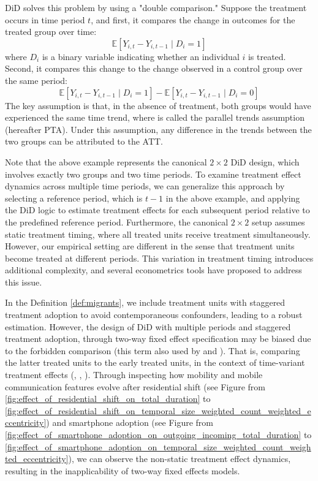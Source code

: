 DiD solves this problem by using a "double comparison." Suppose the treatment occurs in time period \( t \), and first, it compares the change in outcomes for the treated group over time:
\[
\mathbb{E}[Y_{i, t} - Y_{i, t-1} \mid D_i = 1]
\]
where \( D_i \) is a binary variable indicating whether an individual \( i \) is treated. Second, it compares this change to the change observed in a control group over the same period:
\[
\mathbb{E}[Y_{i, t} - Y_{i, t-1} \mid D_i = 1]
-
\mathbb{E}[Y_{i, t} - Y_{i, t-1} \mid D_i = 0]
\]
The key assumption is that, in the absence of treatment, both groups would have experienced the same time trend, where is called the parallel trends assumption (hereafter PTA).
Under this assumption, any difference in the trends between the two groups can be attributed to the ATT.

Note that the above example represents the canonical \( 2 \times 2 \) DiD design, which involves exactly two groups and two time periods.
To examine treatment effect dynamics across multiple time periods, we can generalize this approach by selecting a reference period, which is \( t-1 \) in the above example, and applying the DiD logic to estimate treatment effects for each subsequent period relative to the predefined reference period.
Furthermore, the canonical \( 2 \times 2 \) setup assumes static treatment timing, where all treated units receive treatment simultaneously. However, our empirical setting are different in the sense that treatment units become treated at different periods. This variation in treatment timing introduces additional complexity, and several econometrics tools have proposed to address this issue.


In the Definition \ref{def:migrants}, we include treatment units with staggered treatment adoption to avoid contemporaneous confounders, leading to a robust estimation.
However, the design of DiD with multiple periods and staggered treatment adoption, through two-way fixed effect specification may be biased due to the forbidden comparison (this term also used by \cite{roth2023s} and \cite{de2023two}). That is, comparing the latter treated units to the early treated units, in the context of time-variant treatment effects (\cite{goodman2021difference}, \cite{sun2021estimating}, \cite{baker2022much}).
Through inspecting how mobility and mobile communication features evolve after residential shift (see Figure from \ref{fig:effect_of_residential_shift_on_total_duration} to \ref{fig:effect_of_residential_shift_on_temporal_size_weighted_count_weighted_eccentricity}) and smartphone adoption (see Figure from \ref{fig:effect_of_smartphone_adoption_on_outgoing_incoming_total_duration} to \ref{fig:effect_of_smartphone_adoption_on_temporal_size_weighted_count_weighted_eccentricity}), we can observe the non-static treatment effect dynamics, resulting in the inapplicability of two-way fixed effects models.

